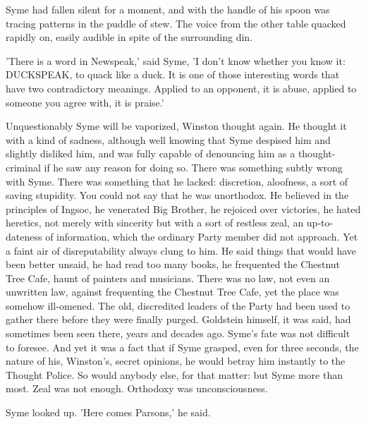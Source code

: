 \documentclass{article}
\begin{document}
Syme had fallen silent for a moment, and with the handle of his spoon was
tracing patterns in the puddle of stew. The voice from the other table
quacked rapidly on, easily audible in spite of the surrounding din.

'There is a word in Newspeak,' said Syme, 'I don't know whether you know
it: DUCKSPEAK, to quack like a duck. It is one of those interesting words
that have two contradictory meanings. Applied to an opponent, it is abuse,
applied to someone you agree with, it is praise.'

Unquestionably Syme will be vaporized, Winston thought again. He thought
it with a kind of sadness, although well knowing that Syme despised him
and slightly disliked him, and was fully capable of denouncing him as a
thought-criminal if he saw any reason for doing so. There was something
subtly wrong with Syme. There was something that he lacked: discretion,
aloofness, a sort of saving stupidity. You could not say that he was
unorthodox. He believed in the principles of Ingsoc, he venerated Big
Brother, he rejoiced over victories, he hated heretics, not merely with
sincerity but with a sort of restless zeal, an up-to-dateness of
information, which the ordinary Party member did not approach. Yet a faint
air of disreputability always clung to him. He said things that would have
been better unsaid, he had read too many books, he frequented the Chestnut
Tree Cafe, haunt of painters and musicians. There was no law, not even an
unwritten law, against frequenting the Chestnut Tree Cafe, yet the place
was somehow ill-omened. The old, discredited leaders of the Party had been
used to gather there before they were finally purged. Goldstein himself,
it was said, had sometimes been seen there, years and decades ago. Syme's
fate was not difficult to foresee. And yet it was a fact that if Syme
grasped, even for three seconds, the nature of his, Winston's, secret
opinions, he would betray him instantly to the Thought Police. So would
anybody else, for that matter: but Syme more than most. Zeal was not
enough. Orthodoxy was unconsciousness.

Syme looked up. 'Here comes Parsons,' he said.
\end{document}
